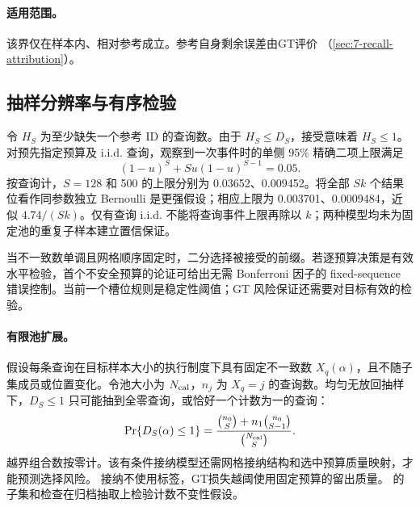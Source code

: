 \paragraph{适用范围。}
该界仅在样本内、相对参考成立。参考自身剩余误差由GT评价
（\cref{sec:7-recall-attribution}）。

\subsection{抽样分辨率与有序检验}

令 $H_S$ 为至少缺失一个参考 ID 的查询数。由于 $H_S\leq D_S$，接受意味着 $H_S\leq1$。对预先指定预算及 i.i.d. 查询，观察到一次事件时的单侧 95\% 精确二项上限满足\cite{nist_binomial}
\begin{equation}
 (1-u)^S+Su(1-u)^{S-1}=0.05.
 \label{eq:6-binomial-limit}
\end{equation}
按查询计，$S=128$ 和 500 的上限分别为 0.03652、0.009452。将全部 $Sk$ 个结果位看作同参数独立 Bernoulli 是更强假设；相应上限为 0.003701、0.0009484，近似 $4.74/(Sk)$。仅有查询 i.i.d. 不能将查询事件上限再除以 $k$；两种模型均未为固定池的重复子样本建立置信保证。

当不一致数单调且网格顺序固定时，二分选择被接受的前缀。若逐预算决策是有效水平检验，首个不安全预算的论证可给出无需 Bonferroni 因子的 fixed-sequence 错误控制\cite{learn_then_test}。当前一个槽位规则是稳定性阈值；GT 风险保证还需要对目标有效的检验。

\paragraph{有限池扩展。}
假设每条查询在目标样本大小的执行制度下具有固定不一致数 $X_q(\alpha)$，且不随子集成员或位置变化。令池大小为 $N_{\rm cal}$，$n_j$ 为 $X_q=j$ 的查询数。均匀无放回抽样下，$D_S\leq1$ 只可能抽到全零查询，或恰好一个计数为一的查询\cite{nist_hypergeometric}：
\begin{equation}
 \Pr\{D_S(\alpha)\leq1\}
 =\frac{\binom{n_0}{S}+n_1\binom{n_0}{S-1}}{\binom{N_{\rm cal}}{S}}.
 \label{eq:6-finite-pool}
\end{equation}
越界组合数按零计。该有条件接纳模型还需网格接纳结构和选中预算质量映射，才能预测选择风险。
接纳不使用标签，GT损失越阈使用固定预算的留出质量。
的子集和检查在归档抽取上检验计数不变性假设。
